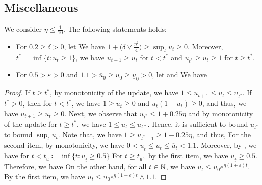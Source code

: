 \subsection{Miscellaneous}
\begin{proposition}
\label{prop:1dsystemaux}
We consider $\eta  \leq \tfrac{1}{10}$. The following statements holds:
\begin{itemize}[leftmargin=*]
\item For $0.2 \geq \delta > 0$, let
We have   $1 + \big( \delta \vee \tfrac{\eta^2}{4} \big)  \geq \sup_{t} u_t \geq 0$.  Moreover, $t^* = \inf \{ t : u_t  \geq 1 \}$, we have $u_{t+1} \geq u_t$ for $t < t^*$ and $ u_{t^*} \geq u_t \geq 1$ for $t \geq t^*$.
\item For   $0.5 > \varepsilon > 0$ and $1.1> \overline{u}_0 \geq u_0 \geq \underline{u}_0  > 0$,  let
and
We have  
\end{itemize}
\end{proposition}


\begin{proof}
If $t \geq t^*$,    by monotonicity of the update, we have  $1 \leq u_{t+1} \leq u_t \leq u_{t^*}$.  If $t^* > 0$, then for $t < t^*$,  we have $1 \geq u_t \geq 0$ and $u_t (1 - u_t) \geq 0$,  and thus,  we have $u_{t+1} \geq u_t \geq 0$.  Next, we observe that  $u_{t^*} \leq 1 + 0.25 \eta$ and  by monotonicity of the update for $t \geq t^*$,   we have $1 \leq u_t \leq u_{t*}$.
Hence, it is sufficient to bound $u_{t^*}$ to bound  $\sup_{t} u_t$.  Note that,  we have $1 \geq u_{t^* - 1} \geq 1 - 0.25 \eta$, and thus,
For the second item,   by monotonicity, we have  $0 < \underline{u}_{t} \leq u_t \leq \overline{u}_{t} < 1.1$.   Moreover,   by  \cite[Lemma A.2]{arous2024high},  we have for $t < t_u \coloneqq \inf \{ t : \underline{u}_t \geq 0.5\}$ 
For $t \geq t_u,$  by the first item,  we have  $\underline{u}_t \geq 0.5$. Therefore, we have
On the other hand,   for all $t \in \mathbb{N}$,  we have $ \overline{u}_t  \leq \overline{u}_{0} e^{\eta (1 + \varepsilon) t}$. By the first item, we have   $ \overline{u}_t  \leq \overline{u}_{0} e^{\eta (1 + \varepsilon) t} \wedge 1.1$.
\end{proof}

